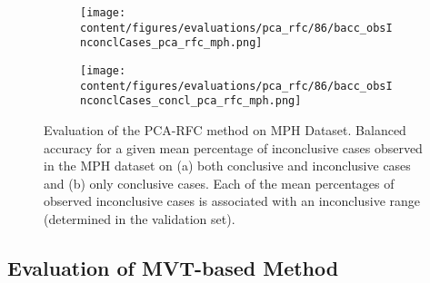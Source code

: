 \begin{figure}[t]
\begin{subfigure}{0.9\textwidth}
  \centering
  \texttt{[image: content/figures/evaluations/pca\_rfc/86/bacc\_obsInconclCases\_pca\_rfc\_mph.png]}
  \subcaption{}
  \label{fig:bacc_obsInconclCases_pca_rfc_mph}
\end{subfigure}
\hfill
\begin{subfigure}{0.9\textwidth}
  \centering
  \texttt{[image: content/figures/evaluations/pca\_rfc/86/bacc\_obsInconclCases\_concl\_pca\_rfc\_mph.png]}
  \subcaption{}
  \label{fig:bacc_obsInconclCases_concl_pca_rfc_mph}
\end{subfigure}

\caption{Evaluation of the PCA-RFC method on MPH Dataset.
Balanced accuracy for a given mean percentage of inconclusive cases observed in the MPH dataset on 
(a) both conclusive and inconclusive cases and (b) only conclusive cases. 
Each of the mean percentages of observed inconclusive cases is associated 
with an inconclusive range (determined in the validation set). }
\label{fig:bacc_obsInconclCases_pca_rfc_mph_full}
\end{figure}



\subsection{Evaluation of MVT-based Method}
\label{subsec:eval_mvt}






